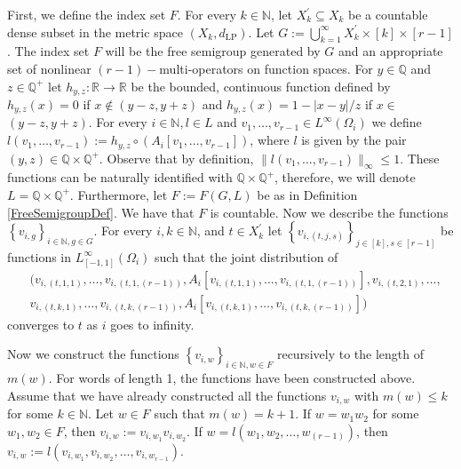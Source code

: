 \documentclass[11pt]{article}
\begin{document}
First, we define the index set $F$. For every $k \in \mathbb{N}$, let $X_{k}^{\prime} \subseteq X_{k}$ be a countable dense subset in the metric space $\left(X_{k}, d_{\mathrm{LP}}\right)$. Let $G:=\bigcup_{k=1}^{\infty} X_{k}^{\prime} \times[k]\times [r-1]$. The index set $F$ will be the free semigroup generated by $G$ and an appropriate set of nonlinear $(r-1)-$multi-operators on function spaces. For $y \in \mathbb{Q}$ and $z \in \mathbb{Q}^{+}$ let $h_{y, z}: \mathbb{R} \rightarrow \mathbb{R}$ be the bounded, continuous function defined by $h_{y, z}(x)=0$ if $x \notin(y-z, y+z)$ and $h_{y, z}(x)=1-|x-y| / z$ if $x \in$ $(y-z, y+z)$. For every $i \in \mathbb{N}, l \in L$ and $v_1,\ldots, v_{r-1} \in L^{\infty}\left(\Omega_{i}\right)$ we define $l(v_1,\ldots,v_{r-1}):=h_{y, z} \circ\left( A_{i}[v_1,\ldots,v_{r-1}]\right)$, where $l$ is given by the pair $(y, z) \in \mathbb{Q} \times \mathbb{Q}^{+}$. Observe that by definition, $\|l(v_1,\ldots,v_{r-1})\|_{\infty} \leq 1$. These functions can be naturally identified with $\mathbb{Q} \times \mathbb{Q}^{+}$, therefore, we will denote $L=\mathbb{Q} \times \mathbb{Q}^{+}$. Furthermore, let $F:=F(G, L)$ be as in Definition \ref{FreeSemigroupDef}. We have that $F$ is countable.
Now we describe the functions $\left\{v_{i, g}\right\}_{i \in \mathbb{N}, g \in G}$. For every $i, k \in \mathbb{N}$, and $t \in X_{k}^{\prime}$ let $\left\{v_{i,(t, j,s)}\right\}_{j\in [k],s\in [r-1]}$ be functions in $L_{[-1,1]}^{\infty}\left(\Omega_{i}\right)$ such that the joint distribution of
$$
\begin{aligned}
&(v_{i,(t, 1,1)},\ldots,v_{i,(t, 1,(r-1))},A_{i}[v_{i,(t, 1,1)},\ldots, v_{i,(t, 1,(r-1))}], v_{i,(t, 2,1)},\ldots,\\
&v_{i,(t, k,1)},\ldots,v_{i,(t, k,(r-1))},A_{i}[v_{i,(t, k,1)},\ldots, v_{i,(t, k,({r-1}))}])
\end{aligned}
$$%
converges to $t$ as $i$ goes to infinity.

Now we construct the functions $\left\{v_{i, w}\right\}_{i \in \mathbb{N}, w \in F}$ recursively to the length of $m(w)$. For words of length 1, the functions have been constructed above. Assume that we have already constructed all the functions $v_{i, w}$ with $m(w) \leq k$ for some $k \in \mathbb{N}$. Let $w \in F$ such that $m(w)=k+1$. If $w=w_{1} w_{2}$ for some $w_{1}, w_{2} \in F$, then $v_{i, w}:=v_{i, w_{1}} v_{i, w_{2}}$. If $w=l\left(w_{1},w_2,\ldots,w_{(r-1)}\right)$, then $v_{i, w}:=l\left(v_{i, w_{1}},v_{i, w_{2}},\ldots,v_{i, w_{r-1}}\right)$.
\end{document}

